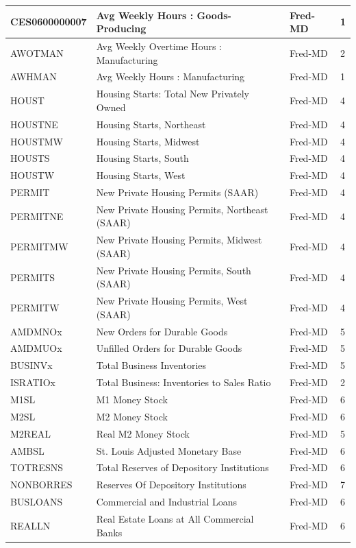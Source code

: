 \documentclass[11pt]{article}
\theoremstyle{plain}
\theoremstyle{definition}
\theoremstyle{remark}
\numberwithin{equation}{section}
\begin{document}
{\begin{longtable}{|l|l|l|l|}
CES0600000007 & Avg Weekly Hours : Goods-Producing & Fred-MD & 1 \\ \hline
AWOTMAN & Avg Weekly Overtime Hours : Manufacturing & Fred-MD & 2 \\ \hline
AWHMAN & Avg Weekly Hours : Manufacturing & Fred-MD & 1 \\ \hline
HOUST & Housing Starts: Total New Privately Owned & Fred-MD & 4 \\ \hline
HOUSTNE & Housing Starts, Northeast & Fred-MD & 4 \\ \hline
HOUSTMW & Housing Starts, Midwest & Fred-MD & 4 \\ \hline
HOUSTS & Housing Starts, South & Fred-MD & 4 \\ \hline
HOUSTW & Housing Starts, West & Fred-MD & 4 \\ \hline
PERMIT & New Private Housing Permits (SAAR) & Fred-MD & 4 \\ \hline
PERMITNE & New Private Housing Permits, Northeast (SAAR) & Fred-MD & 4 \\ \hline
PERMITMW & New Private Housing Permits, Midwest (SAAR) & Fred-MD & 4 \\ \hline
PERMITS & New Private Housing Permits, South (SAAR) & Fred-MD & 4 \\ \hline
PERMITW & New Private Housing Permits, West (SAAR) & Fred-MD & 4 \\ \hline
AMDMNOx & New Orders for Durable Goods & Fred-MD & 5 \\ \hline
AMDMUOx & Unfilled Orders for Durable Goods & Fred-MD & 5 \\ \hline
BUSINVx & Total Business Inventories & Fred-MD & 5 \\ \hline
ISRATIOx & Total Business: Inventories to Sales Ratio & Fred-MD & 2 \\ \hline
M1SL & M1 Money Stock & Fred-MD & 6 \\ \hline
M2SL & M2 Money Stock & Fred-MD & 6 \\ \hline
M2REAL & Real M2 Money Stock & Fred-MD & 5 \\ \hline
AMBSL & St. Louis Adjusted Monetary Base & Fred-MD & 6 \\ \hline
TOTRESNS & Total Reserves of Depository Institutions & Fred-MD & 6 \\ \hline
NONBORRES & Reserves Of Depository Institutions & Fred-MD & 7 \\ \hline
BUSLOANS & Commercial and Industrial Loans & Fred-MD & 6 \\ \hline
REALLN & Real Estate Loans at All Commercial Banks & Fred-MD & 6 \\ \hline

\end{longtable}}
\end{document}
